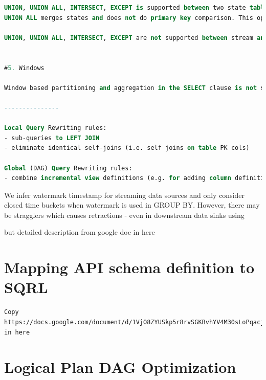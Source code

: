 \documentclass[	DIV=calc,%
							paper=letter,%
							fontsize=11pt,%
							twocolumn]{scrartcl}	 					%
\begin{document}
\begin{lstlisting}[language=SQL]
UNION, UNION ALL, INTERSECT, EXCEPT is supported between two state tables if they have the same primary key. However, the semantics is different from standard SQL: the comparison is done only on the primary key columns. For UNION, INTERSECT and EXCEPT the non-primary key values of the left hand side are used for columns with the same primary key. These operations preserve the original primary key.
UNION ALL merges states and does not do primary key comparison. This operation extends the primary key by an additional column that keeps track of which table a particular record came from and to ensure that the primary key remains unique.

UNION, UNION ALL, INTERSECT, EXCEPT are not supported between stream and state tables.


#5. Windows

Window based partitioning and aggregation in the SELECT clause is not supported by SQRL.

---------------

Local Query Rewriting rules:
- sub-queries to LEFT JOIN
- eliminate identical self-joins (i.e. self joins on table PK cols)

Global (DAG) Query Rewriting rules:
- combine incremental view definitions (e.g. for adding column definitions) that are chained together in a straight line (i.e. no other dependencies) and don't reference previously defined columns

\end{lstlisting}


We infer watermark timestamp for streaming data sources and only consider closed time buckets when watermark is used in GROUP BY. However, there may be stragglers which causes retractions - even in downstream data sinks using

but detailed description from google doc in here

\section{Mapping API schema definition to SQRL}
\label{appendix:sqrl2graphql}

\begin{verbatim}
Copy https://docs.google.com/document/d/1VjO8ZYUSkp5r8rvSGKBvhYV4M30sLoPqacjUyIkonXM/edit# in here
\end{verbatim}


\section{Logical Plan DAG Optimization}
\label{appendix:optimalDAG}
\end{document}
